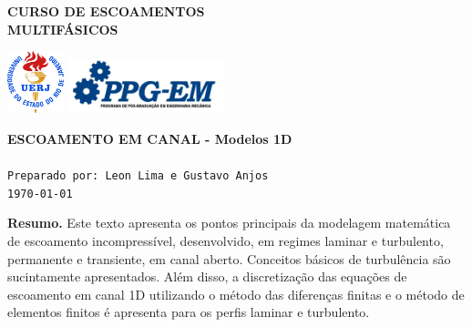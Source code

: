 \documentclass[a4paper,portuguese,10pt]{article}
\begin{document}
\thispagestyle{empty}

\begin{minipage}{0.5\linewidth}
	\large\textbf{CURSO DE ESCOAMENTOS\\MULTIFÁSICOS}
\end{minipage}
\begin{minipage}{0.5\linewidth}
	\flushright
	\includegraphics[height=18mm]{figs/logouerj.jpg}
	\hspace{.5cm}
	\includegraphics[height=16mm]{figs/logo_ppg-em.jpg}
\end{minipage}

\hrulefill

\Large \color{NavyBlue} \textbf{ESCOAMENTO EM CANAL - Modelos 1D}\\
\color{Black}\\ %
\normalsize \texttt{Preparado por: Leon Lima e Gustavo Anjos}\\
\normalsize \texttt{\today}


\hrulefill
\begin{center}
	\begin{minipage}{0.8\linewidth}
		\footnotesize{\textbf{Resumo.} Este texto apresenta os pontos
		principais da modelagem matemática de escoamento incompressível,
		desenvolvido, em regimes laminar e turbulento, permanente e
		transiente, em canal aberto. Conceitos básicos de turbulência
		são sucintamente apresentados. Além disso, a discretização das
		equações de escoamento em canal 1D utilizando o método das
		diferenças finitas e o método de elementos finitos é apresenta
		para os perfis laminar e turbulento.}
	\end{minipage}
\end{center}

{\footnotesize\tableofcontents}
\hrulefill\\
\onehalfspacing
\vspace{10mm}








\singlespacing




\end{document}
